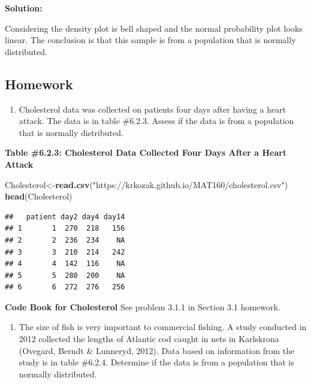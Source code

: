 \documentclass[]{book}
\newenvironment{Shaded}{\begin{snugshade}}{\end{snugshade}}
\newcommand{\KeywordTok}[1]{\textcolor[rgb]{0.13,0.29,0.53}{\textbf{#1}}}
\newcommand{\NormalTok}[1]{#1}
\newcommand{\StringTok}[1]{\textcolor[rgb]{0.31,0.60,0.02}{#1}}
\providecommand{\tightlist}{%
  \setlength{\itemsep}{0pt}\setlength{\parskip}{0pt}}
\begin{document}
\textbf{Solution:}

Considering the density plot is bell shaped and the normal probability plot looks linear. The conclusion is that this sample is from a population that is normally distributed.

\hypertarget{homework-18}{%
\subsection{Homework}\label{homework-18}}

\begin{enumerate}
\def\labelenumi{\arabic{enumi}.}
\tightlist
\item
  Cholesterol data was collected on patients four days after having a heart attack. The data is in table \#6.2.3. Assess if the data is from a population that is normally distributed.
\end{enumerate}

\textbf{Table \#6.2.3: Cholesterol Data Collected Four Days After a Heart Attack}

\begin{Shaded}
\begin{Highlighting}[]
\NormalTok{Cholesterol<-}\KeywordTok{read.csv}\NormalTok{(}\StringTok{"https://krkozak.github.io/MAT160/cholesterol.csv"}\NormalTok{)}
\KeywordTok{head}\NormalTok{(Cholesterol)}
\end{Highlighting}
\end{Shaded}

\begin{verbatim}
##   patient day2 day4 day14
## 1       1  270  218   156
## 2       2  236  234    NA
## 3       3  210  214   242
## 4       4  142  116    NA
## 5       5  280  200    NA
## 6       6  272  276   256
\end{verbatim}

\textbf{Code Book for Cholesterol} See problem 3.1.1 in Section 3.1 homework.

\begin{enumerate}
\def\labelenumi{\arabic{enumi}.}
\setcounter{enumi}{1}
\tightlist
\item
  The size of fish is very important to commercial fishing. A study conducted in 2012 collected the lengths of Atlantic cod caught in nets in Karlskrona (Ovegard, Berndt \& Lunneryd, 2012). Data based on information from the study is in table \#6.2.4. Determine if the data is from a population that is normally distributed.
\end{enumerate}
\end{document}
